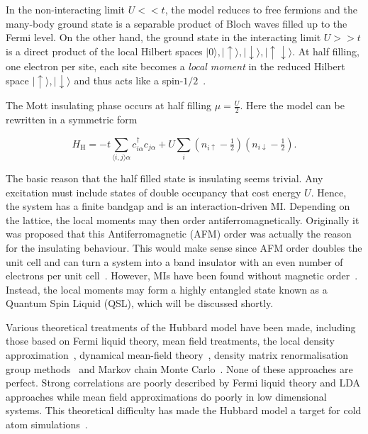 In the non-interacting limit \(U << t\), the model reduces to free fermions and the many-body ground state is a separable product of Bloch waves filled up to the Fermi level. On the other hand, the ground state in the interacting limit \(U >> t\) is a direct product of the local Hilbert spaces \(|0\rangle, |\uparrow\rangle, |\downarrow\rangle, |\uparrow\downarrow\rangle\). At half filling, one electron per site, each site becomes a \emph{local moment} in the reduced Hilbert space \(|\uparrow\rangle, |\downarrow\rangle\) and thus acts like a spin-\(1/2\)~\autocite{hubbardElectronCorrelationsNarrow1964}.

The Mott insulating phase occurs at half filling \(\mu = \tfrac{U}{2}\). Here the model can be rewritten in a symmetric form

\[ H_{\mathrm{H}} = -t \sum_{\langle i,j \rangle \alpha} c^\dagger_{i\alpha} c_{j\alpha} + U \sum_i (n_{i\uparrow} - \tfrac{1}{2})(n_{i\downarrow} - \tfrac{1}{2}).\]

The basic reason that the half filled state is insulating seems trivial. Any excitation must include states of double occupancy that cost energy \(U\). Hence, the system has a finite bandgap and is an interaction-driven MI. Depending on the lattice, the local moments may then order antiferromagnetically. Originally it was proposed that this Antiferromagnetic (AFM) order was actually the reason for the insulating behaviour. This would make sense since AFM order doubles the unit cell and can turn a system into a band insulator with an even number of electrons per unit cell~\autocite{mottMetalInsulatorTransitions1990}. However, MIs have been found without magnetic order~\autocite{law1TTaS2QuantumSpin2017,ribakGaplessExcitationsGround2017}. Instead, the local moments may form a highly entangled state known as a Quantum Spin Liquid (QSL), which will be discussed shortly.

Various theoretical treatments of the Hubbard model have been made, including those based on Fermi liquid theory, mean field treatments, the local density approximation~\autocite{slaterMagneticEffectsHartreeFock1951}, dynamical mean-field theory~\autocite{greinerQuantumPhaseTransition2002}, density matrix renormalisation group methods~\autocite{hallbergNewTrendsDensity2006,schollwöckDensitymatrixRenormalizationGroup2005,whiteDensityMatrixFormulation1992} and Markov chain Monte Carlo~\autocite{blankenbeclerMonteCarloCalculations1981,hirschDiscreteHubbardStratonovichTransformation1983,whiteNumericalStudyTwodimensional1989}. None of these approaches are perfect. Strong correlations are poorly described by Fermi liquid theory and LDA approaches while mean field approximations do poorly in low dimensional systems. This theoretical difficulty has made the Hubbard model a target for cold atom simulations~\autocite{mazurenkoColdatomFermiHubbard2017}.

